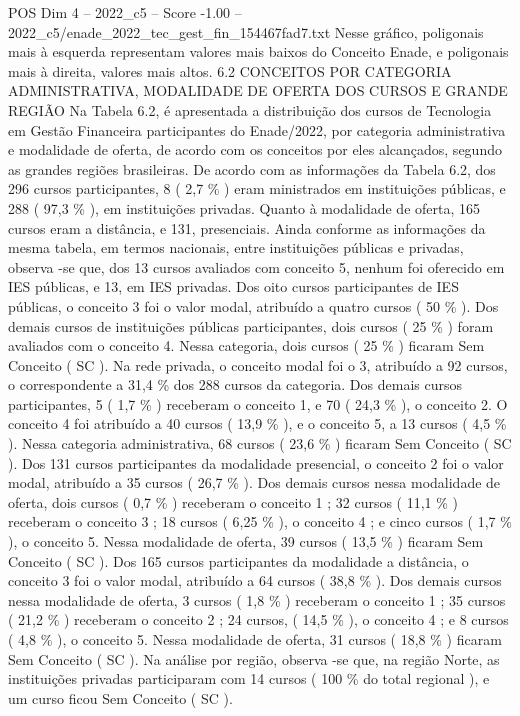 \begin{textsample}{POS Dim 4 – 2022\_c5 – Score -1.00 – 2022\_c5/enade\_2022\_tec\_gest\_fin\_154467fad7.txt}
Nesse gráfico, poligonais mais à esquerda representam valores mais baixos do Conceito Enade, e poligonais mais à direita, valores mais altos. 6.2 CONCEITOS POR CATEGORIA ADMINISTRATIVA, MODALIDADE DE OFERTA DOS CURSOS E GRANDE REGIÃO Na Tabela 6.2, é apresentada a distribuição dos cursos de Tecnologia em Gestão Financeira participantes do Enade/2022, por categoria administrativa e modalidade de oferta, de acordo com os conceitos por eles alcançados, segundo as grandes regiões brasileiras.
De acordo com as informações da Tabela 6.2, dos 296 cursos participantes, 8 ( 2,7 \% ) eram ministrados em instituições públicas, e 288 ( 97,3 \% ), em instituições privadas.
Quanto à modalidade de oferta, 165 cursos eram a distância, e 131, presenciais.
Ainda conforme as informações da mesma tabela, em termos nacionais, entre instituições públicas e privadas, observa -se que, dos 13 cursos avaliados com conceito 5, nenhum foi oferecido em IES públicas, e 13, em IES privadas.
Dos oito cursos participantes de IES públicas, o conceito 3 foi o valor modal, atribuído a quatro cursos ( 50 \% ).
Dos demais cursos de instituições públicas participantes, dois cursos ( 25 \% ) foram avaliados com o conceito 4.
Nessa categoria, dois cursos ( 25 \% ) ficaram Sem Conceito ( SC ).
Na rede privada, o conceito modal foi o 3, atribuído a 92 cursos, o correspondente a 31,4 \% dos 288 cursos da categoria.
Dos demais cursos participantes, 5 ( 1,7 \% ) receberam o conceito 1, e 70 ( 24,3 \% ), o conceito 2.
O conceito 4 foi atribuído a 40 cursos ( 13,9 \% ), e o conceito 5, a 13 cursos ( 4,5 \% ).
Nessa categoria administrativa, 68 cursos ( 23,6 \% ) ficaram Sem Conceito ( SC ).
Dos 131 cursos participantes da modalidade presencial, o conceito 2 foi o valor modal, atribuído a 35 cursos ( 26,7 \% ).
Dos demais cursos nessa modalidade de oferta, dois cursos ( 0,7 \% ) receberam o conceito 1 ; 32 cursos ( 11,1 \% ) receberam o conceito 3 ; 18 cursos ( 6,25 \% ), o conceito 4 ; e cinco cursos ( 1,7 \% ), o conceito 5.
Nessa modalidade de oferta, 39 cursos ( 13,5 \% ) ficaram Sem Conceito ( SC ).
Dos 165 cursos participantes da modalidade a distância, o conceito 3 foi o valor modal, atribuído a 64 cursos ( 38,8 \% ).
Dos demais cursos nessa modalidade de oferta, 3 cursos ( 1,8 \% ) receberam o conceito 1 ; 35 cursos ( 21,2 \% ) receberam o conceito 2 ; 24 cursos, ( 14,5 \% ), o conceito 4 ; e 8 cursos ( 4,8 \% ), o conceito 5.
Nessa modalidade de oferta, 31 cursos ( 18,8 \% ) ficaram Sem Conceito ( SC ).
Na análise por região, observa -se que, na região Norte, as instituições privadas participaram com 14 cursos ( 100 \% do total regional ), e um curso ficou Sem Conceito ( SC ).

\end{textsample}

